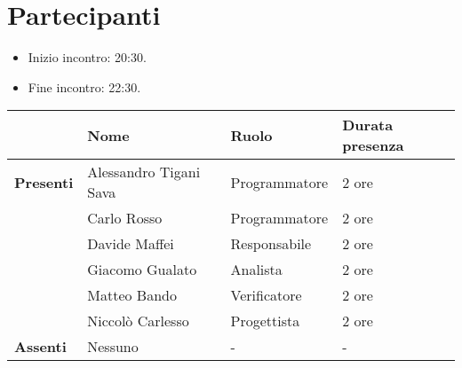 \section*{Partecipanti}

\begin{itemize}
	\item Inizio incontro: 20:30.
	\item Fine incontro: 22:30.
\end{itemize}


\begin{center}
	\begin{tabular}{llll}
		                  & \textbf{Nome}          & \textbf{Ruolo} & \textbf{Durata presenza} \\
		\hline
		\textbf{Presenti} & Alessandro Tigani Sava & Programmatore 	& 2 ore	\\
		                  & Carlo Rosso            & Programmatore	& 2 ore	\\
		                  & Davide Maffei          & Responsabile	& 2 ore	\\
		                  & Giacomo Gualato        & Analista		& 2 ore	\\
		                  & Matteo Bando           & Verificatore	& 2 ore	\\
		                  & Niccolò Carlesso       & Progettista	& 2 ore	\\
		\hline
		\textbf{Assenti}  & Nessuno                & -              & -		\\
	\end{tabular}
\end{center}
